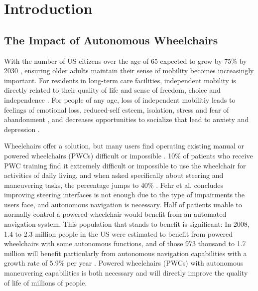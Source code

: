 

\chapter{Introduction}
\label{ch:Introduction}




\section{The Impact of Autonomous Wheelchairs}


With the number of US citizens over the age of 65 expected to grow by 75\% by
2030 \cite{simpson2008many}, ensuring older adults maintain their sense of
mobility becomes increasingly important.
For residents in long-term care facilities, independent mobility is directly
related to their quality of life and sense of freedom, choice and independence
\cite{bourret2002meaning}.
For people of any age, loss of independent mobilitiy leads to feelings of
emotional loss, reduced-self esteem, isolation, stress and fear of abandonment
\cite{finlayson2003experiencing}, and decreases opportunities to socialize that
lead to anxiety and depression \cite{iezzoni2001mobility}. 

Wheelchairs offer a solution, but many users find operating existing manual or
powered wheelchairs (PWCs) difficult or impossible \cite{simpson2008many}.
10\% of patients who receive PWC training find it extremely difficult or
impossible to use the wheelchair for activities of daily living, and
when asked specifically about steering and maneuvering tasks, the
percentage jumps to 40\% \cite{fehr2000adequacy}.
Fehr et al. \cite{fehr2000adequacy} concludes improving steering interfaces is
not enough due to the type of impairments the users face, and autonomous
navigation is necessary. Half of patients unable to normally control a powered
wheelchair would benefit from an automated navigation system.
This population that stands to benefit is significant:
In 2008, 1.4 to 2.3 million people in the US were estimated to
benefit from powered wheelchairs with some autonomous functions, and of those
973 thousand to 1.7 million will benefit particularly from autonomous
navigation capabilities with a growth rate of 5.9\% per year \cite{simpson2008many}.
Powered wheelchairs (PWCs) with autonomous maneuvering capabilities is both
necessary and will directly improve the quality of life of millions of people.

